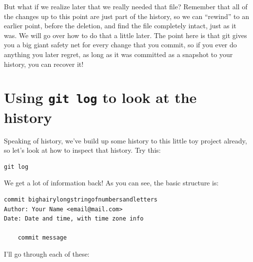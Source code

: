 \documentclass{article}
\begin{document}
But what if we realize later that we really needed that file?  Remember that all of the changes up to this point are just part of the history, so we can ``rewind'' to an earlier point, before the deletion, and find the file completely intact, just as it was.  We will go over how to do that a little later.  The point here is that git gives you a big giant safety net for every change that you commit, so if you ever do anything you later regret, as long as it was committed as a snapshot to your history, you can recover it!
\section{Using \texttt{git log} to look at the history}
\label{sec-8}

Speaking of history, we've build up some history to this little toy project already, so let's look at how to inspect that history.  Try this:


\begin{verbatim}
git log
\end{verbatim}

We get a lot of information back!  As you can see, the basic structure is:


\begin{verbatim}
commit bighairylongstringofnumbersandletters
Author: Your Name <email@mail.com>
Date: Date and time, with time zone info

    commit message
\end{verbatim}

I'll go through each of these:
\end{document}
